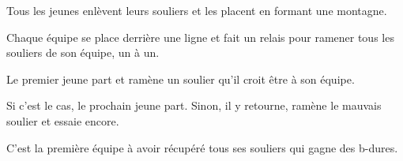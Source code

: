 \documentclass{grand-jeu}
\begin{document}
\begin{regles}
Tous les jeunes enlèvent leurs souliers et les placent en formant une montagne. 

Chaque équipe se place derrière une ligne et fait un relais pour ramener tous les souliers de son équipe, un à un.  

Le premier jeune part et ramène un soulier qu’il croit être à son équipe. 

Si c’est le cas, le prochain jeune part. Sinon, il y retourne, ramène le mauvais soulier et essaie encore.

C’est la première équipe à avoir récupéré tous ses souliers qui gagne des b-dures.
\end{regles}

\begin{imaginaire}

\end{imaginaire}

\begin{moments-stop}
\end{moments-stop}
\end{document}
